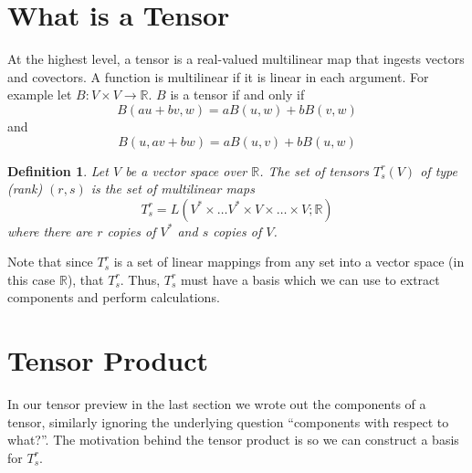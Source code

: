 \documentclass[a4paper]{article}
\newtheorem*{defn}{Definition}
\begin{document}
\section*{What is a Tensor}%
At the highest level, a tensor is a real-valued multilinear map that ingests vectors and covectors. A function is multilinear if it is linear in each argument. For example let $B: V \times V \rightarrow \mathds{R}$. $B$ is a tensor if and only if
\[
  B(au + bv, w) = aB(u,w) + bB(v,w)
\]
and
\[
  B(u, av + bw) = aB(u,v) + bB(u,w)
\]

\begin{defn}
  Let $V$ be a vector space over $\mathds{R}$. The set of tensors $T_s^r(V)$ of type (rank) $(r,s)$ is the set of multilinear maps
  \[
    T_s^r = L(V^* \times \dots V^* \times V \times \dots \times V; \mathds{R})
  \]
  where there are $r$ copies of $V^*$ and $s$ copies of $V$.
\end{defn}
Note that since $T_s^r$ is a set of linear mappings from any set into a vector space (in this case $\mathds{R}$), that $T_s^r$. Thus, $T_s^r$ must have a basis which we can use to extract components and perform calculations.

\section*{Tensor Product}%
In our tensor preview in the last section we wrote out the components of a tensor, similarly ignoring the underlying question ``components with respect to what?''. The motivation behind the tensor product is so we can construct a basis for $T_s^r$.
\end{document}
